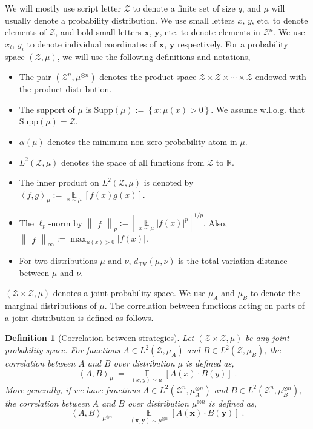\documentclass[11pt]{article}
\newcommand{\inbrace}[1]{\left \{ #1 \right \}}
\newcommand{\insquare}[1]{\left [ #1 \right ]}
\newcommand{\inangle}[1]{\left \langle #1 \right \rangle}
\newcommand{\norm}[2]{\begin{Vmatrix} #2 \end{Vmatrix}_{#1}}
\newcommand{\set}[1]{\inbrace{#1}}
\newcommand{\setdef}[2]{\set{#1 : #2}}
\DeclareMathOperator*{\Ex}{\mathbb{E}}
\newcommand{\dTV}{d_{\mathrm{TV}}}
\newcommand{\bbR}{{\mathbb R}}
\newcommand{\bx}{{\bm x}}
\newcommand{\by}{{\bm y}}
\newcommand{\calZ}{\mathcal{Z}}
\newcommand{\Supp}{\mathrm{Supp}}
\newtheorem{defn}[theorem]{Definition}
\begin{document}
We will mostly use script letter $\calZ$ to denote a finite set of size $q$, and $\mu$ will usually denote a probability distribution. We use small letters $x$, $y$, etc. to denote elements of $\calZ$, and bold small letters $\bx$, $\by$, etc. to denote elements in $\calZ^n$. We use $x_i$, $y_i$ to denote individual coordinates of $\bx$, $\by$ respectively. For a probability space $(\calZ, \mu)$, we will use the following definitions and notations,
\begin{itemize}
\item The pair $(\calZ^n, \mu^{\otimes n})$ denotes the product space $\calZ \times \calZ \times \cdots \times \calZ$ endowed with the product distribution.
\item The support of $\mu$ is $\Supp(\mu) := \setdef{x}{\mu(x) >0}$. We assume w.l.o.g. that $\Supp(\mu) = \calZ$.
\item $\alpha(\mu)$ denotes the minimum non-zero probability atom in $\mu$.
\item $L^2(\calZ,\mu)$ denotes the space of all functions from $\calZ$ to $\bbR$.
\item The inner product on $L^2(\calZ,\mu)$ is denoted by $\inangle{f,g}_{\mu} := \Ex\limits_{x \sim \mu}[f(x) g(x)]$.
\item The $\ell_p$-norm by $\norm{p}{f} := \insquare{\Ex\limits_{x \sim \mu}|f(x)|^p}^{1/p}$. Also, $ \norm{\infty}{f} := \max_{\mu(x) >0} |f(x)|$. %
\item For two distributions $\mu$ and $\nu$, $\dTV(\mu, \nu)$ is the total variation distance between $\mu$ and $\nu$.
\end{itemize}
$(\calZ \times \calZ, \mu)$ denotes a joint probability space. We use $\mu_A$ and $\mu_B$ to denote the marginal distributions of $\mu$. The correlation between functions acting on parts of a joint distribution is defined as follows.
\begin{defn}[Correlation between strategies] \label{def:corr_strategies}
	Let $(\calZ \times \calZ, \mu)$ be any joint probability space. For functions $A \in L^2(\calZ, \mu_A)$ and $B \in L^2(\calZ, \mu_B)$, the correlation between $A$ and $B$ over distribution $\mu$ is defined as,
	\[ \inangle{A, B}_{\mu} ~=~ \Ex\limits_{(x, y) \sim \mu} \insquare{A(x) \cdot B(y)}\;.\]
	More generally, if we have functions $A \in L^2(\calZ^n, \mu_A^{\otimes n})$ and $B \in L^2(\calZ^n, \mu_B^{\otimes n})$, the correlation between $A$ and $B$ over distribution $\mu^{\otimes n}$ is defined as,
	\[ \inangle{A, B}_{\mu^{\otimes n}} ~=~ \Ex\limits_{(\bx, \by) \sim \mu^{\otimes n}} \insquare{A(\bx) \cdot B(\by)}\;.\]
\end{defn}
\end{document}
